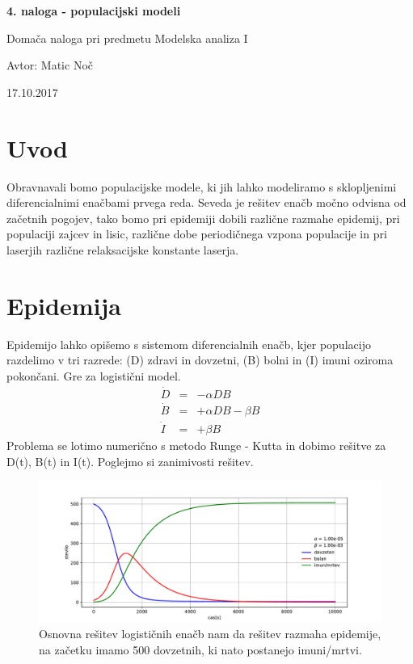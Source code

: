 \documentclass[11pt, a4paper]{article}
\begin{document}
	
	\begin{center}
	{\LARGE\bfseries 4. naloga - populacijski modeli \par}
	\vspace{1cm}
	
	{\Large Domača naloga pri predmetu Modelska analiza I\par}
	\vspace{0.2cm}
	{\normalsize Avtor: Matic Noč \par}
	\vspace{0.2cm}	
	{\normalsize 17.10.2017 \par}	

	

	
	\end{center}

\section{Uvod}
Obravnavali bomo populacijske modele, ki jih lahko modeliramo s sklopljenimi diferencialnimi enačbami prvega reda. Seveda je rešitev enačb močno odvisna od začetnih pogojev, tako bomo pri epidemiji dobili različne razmahe epidemij, pri populaciji zajcev in lisic, različne dobe periodičnega vzpona populacije in pri laserjih različne relaksacijske konstante laserja.

\section{Epidemija}
Epidemijo lahko opišemo s sistemom diferencialnih enačb, kjer populacijo razdelimo v tri razrede: (D) zdravi in dovzetni, (B) bolni in (I) imuni oziroma pokončani. Gre za logistični model.
\begin{equation}
\begin{array} {lcl} \dot{D} & = & -\alpha DB \\
\dot{B}  & = & +\alpha DB - \beta B 
 \\
\dot{I}  & = & +\beta B \end{array}
\end{equation}
 Problema se lotimo numerično s metodo Runge - Kutta in dobimo rešitve za D(t), B(t) in I(t).
Poglejmo si zanimivosti rešitev.
\begin{figure}[htb!]
  \centering
  \includegraphics[width=18cm]{oblika_grafa.pdf}
 \caption{Osnovna rešitev logističnih enačb nam da rešitev razmaha epidemije, na začetku imamo 500 dovzetnih, ki nato postanejo imuni/mrtvi.}
\end{figure}
\end{document}
